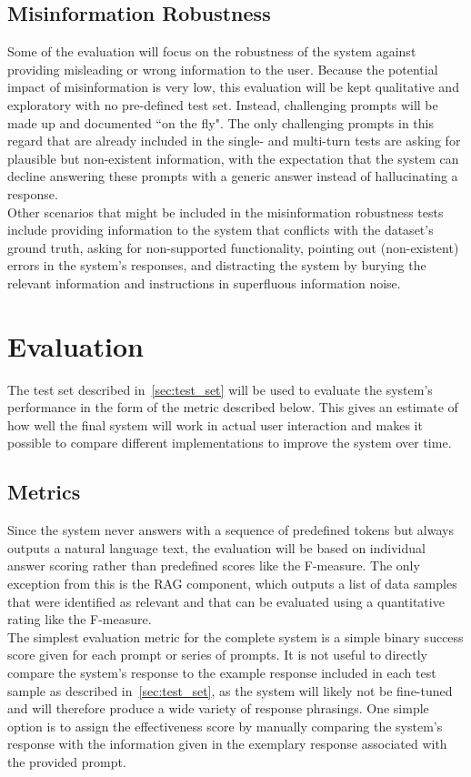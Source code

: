 \documentclass{article}
\begin{document}
\subsection{Misinformation Robustness}
Some of the evaluation will focus on the robustness of the system against providing misleading or wrong information to the user. Because the potential impact of misinformation is very low, this evaluation will be kept qualitative and exploratory with no pre-defined test set. Instead, challenging prompts will be made up and documented ``on the fly". The only challenging prompts in this regard that are already included in the single- and multi-turn tests are asking for plausible but non-existent information, with the expectation that the system can decline answering these prompts with a generic answer instead of hallucinating a response.\\

Other scenarios that might be included in the misinformation robustness tests include providing information to the system that conflicts with the dataset's ground truth, asking for non-supported functionality, pointing out (non-existent) errors in the system's responses, and distracting the system by burying the relevant information and instructions in superfluous information noise.

\section{Evaluation}
The test set described in~\cref{sec:test_set} will be used to evaluate the system's performance in the form of the metric described below. This gives an estimate of how well the final system will work in actual user interaction and makes it possible to compare different implementations to improve the system over time.

\subsection{Metrics}
Since the system never answers with a sequence of predefined tokens but always outputs a natural language text, the evaluation will be based on individual answer scoring rather than predefined scores like the F-measure. The only exception from this is the RAG component, which outputs a list of data samples that were identified as relevant and that can be evaluated using a quantitative rating like the F-measure.\\

The simplest evaluation metric for the complete system is a simple binary success score given for each prompt or series of prompts. It is not useful to directly compare the system's response to the example response included in each test sample as described in~\cref{sec:test_set}, as the system will likely not be fine-tuned and will therefore produce a wide variety of response phrasings. One simple option is to assign the effectiveness score by manually comparing the system's response with the information given in the exemplary response associated with the provided prompt.\\
\end{document}
